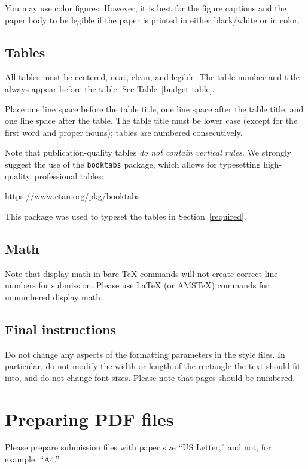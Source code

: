 \documentclass{article}
\begin{document}
You may use color figures.  However, it is best for the figure captions and the
paper body to be legible if the paper is printed in either black/white or in
color.


\subsection{Tables}


All tables must be centered, neat, clean, and legible.  The table number and
title always appear before the table.  See Table~\ref{budget-table}.


Place one line space before the table title, one line space after the
table title, and one line space after the table. The table title must
be lower case (except for the first word and proper nouns); tables are
numbered consecutively.


Note that publication-quality tables \emph{do not contain vertical rules}. We
strongly suggest the use of the \verb+booktabs+ package, which allows for
typesetting high-quality, professional tables:
\begin{center}
  \url{https://www.ctan.org/pkg/booktabs}
\end{center}
This package was used to typeset the tables in Section~\ref{required}.


\subsection{Math}
Note that display math in bare TeX commands will not create correct line numbers
for submission. Please use LaTeX (or AMSTeX) commands for unnumbered display
math.


\subsection{Final instructions}

Do not change any aspects of the formatting parameters in the style files.  In
particular, do not modify the width or length of the rectangle the text should
fit into, and do not change font sizes. Please note that pages should be
numbered.


\section{Preparing PDF files}


Please prepare submission files with paper size ``US Letter,'' and not, for
example, ``A4.''
\end{document}
